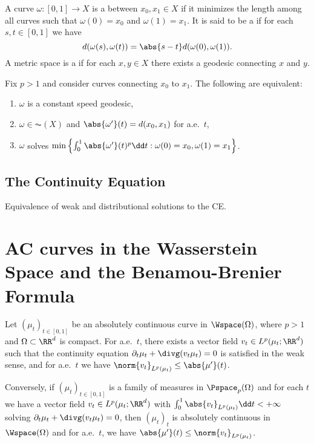 \documentclass[oneside,reqno,letterpaper]{amsart}
\begin{document}
\begin{definition}
  A curve \(\omega: [0, 1] \to X\) is a  between \(x_0, x_1 \in X\) if it minimizes the length among all curves such that \(\omega(0) = x_0\) and \(\omega(1) = x_1\).
  It is said to be a  if for each \(s, t \in [0, 1]\) we have
  \[
    d(\omega(s), \omega(t)) = \abs{s - t} d(\omega(0), \omega(1)).
  \]
  A metric space is a  if for each \(x, y \in X\) there exists a geodesic connecting \(x\) and \(y\).
\end{definition}

\begin{proposition}
  Fix \(p > 1\) and consider curves connecting \(x_0\) to \(x_1\).
  The following are equivalent:
  \begin{enumerate}[label=(\roman*)]
    \item \(\omega\) is a constant speed geodesic,
    \item \(\omega \in \AC(X)\) and \(\abs{\omega'}(t) = d(x_0, x_1)\) for a.e.\ \(t\),
    \item \(\omega\) solves \(\min\left\{\int_0^1 \abs{\omega'}(t)^p \dd t: \omega(0) = x_0, \omega(1) = x_1 \right\}\).
  \end{enumerate}
\end{proposition}



\subsection{The Continuity Equation}
\begin{definition}
\end{definition}

\begin{proposition}
Equivalence of weak and distributional solutions to the CE.
\end{proposition}






\section{AC curves in the Wasserstein Space and the Benamou-Brenier Formula}
\begin{theorem}
  Let \((\mu_t)_{t \in [0, 1]}\) be an absolutely continuous curve in \(\Wspace(\Omega)\), where \(p > 1\) and \(\Omega \subset \RR^d\) is compact.
  For a.e.\ \(t\), there exists a vector field \(v_t \in L^p(\mu_t; \RR^d)\) such that the continuity equation \(\partial_t \mu_t + \divg (v_t \mu_t) = 0\) is satisfied in the weak sense, and for a.e.\ \(t\) we have \(\norm{v_t}_{L^p(\mu_t)} \leq \abs{\mu'}(t)\).

  Conversely, if \((\mu_t)_{t \in [0, 1]}\) is a family of measures in \(\Pspace_p(\Omega)\) and for each \(t\) we have a vector field \(v_t \in L^p(\mu_t; \RR^d)\) with \(\int_0^1 \abs{v_t}_{L^p(\mu_t)} \dd t < +\infty\) solving \(\partial_t \mu_t + \divg (v_t \mu_t) = 0\), then \((\mu_t)_t\) is absolutely continuous in \(\Wspace(\Omega)\) and for a.e.\ \(t\), we have \(\abs{\mu'}(t) \leq \norm{v_t}_{L^p(\mu_t)}\).
\end{theorem}
\end{document}
